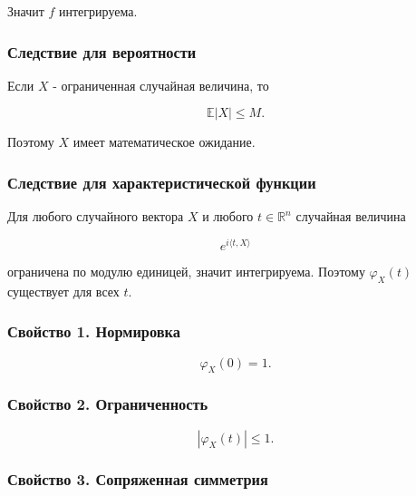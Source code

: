 \documentclass[
  11pt,
  a4paper,
]{article}
\begin{document}
Значит \(f\) интегрируема.

\subsubsection{Следствие для
вероятности}\label{ux441ux43bux435ux434ux441ux442ux432ux438ux435-ux434ux43bux44f-ux432ux435ux440ux43eux44fux442ux43dux43eux441ux442ux438}

Если \(X\) - ограниченная случайная величина, то

\[
\mathbb E|X|\le M.
\]

Поэтому \(X\) имеет математическое ожидание.

\subsubsection{Следствие для характеристической
функции}\label{ux441ux43bux435ux434ux441ux442ux432ux438ux435-ux434ux43bux44f-ux445ux430ux440ux430ux43aux442ux435ux440ux438ux441ux442ux438ux447ux435ux441ux43aux43eux439-ux444ux443ux43dux43aux446ux438ux438}

Для любого случайного вектора \(X\) и любого \(t\in\mathbb R^n\)
случайная величина

\[
e^{i\langle t,X\rangle}
\]

ограничена по модулю единицей, значит интегрируема. Поэтому
\(\varphi_X(t)\) существует для всех \(t\).

\subsubsection{Свойство 1.
Нормировка}\label{ux441ux432ux43eux439ux441ux442ux432ux43e-1.-ux43dux43eux440ux43cux438ux440ux43eux432ux43aux430}

\[
\varphi_X(0)=1.
\]

\subsubsection{Свойство 2.
Ограниченность}\label{ux441ux432ux43eux439ux441ux442ux432ux43e-2.-ux43eux433ux440ux430ux43dux438ux447ux435ux43dux43dux43eux441ux442ux44c}

\[
|\varphi_X(t)|\le1.
\]

\subsubsection{Свойство 3. Сопряженная
симметрия}\label{ux441ux432ux43eux439ux441ux442ux432ux43e-3.-ux441ux43eux43fux440ux44fux436ux435ux43dux43dux430ux44f-ux441ux438ux43cux43cux435ux442ux440ux438ux44f}
\end{document}
